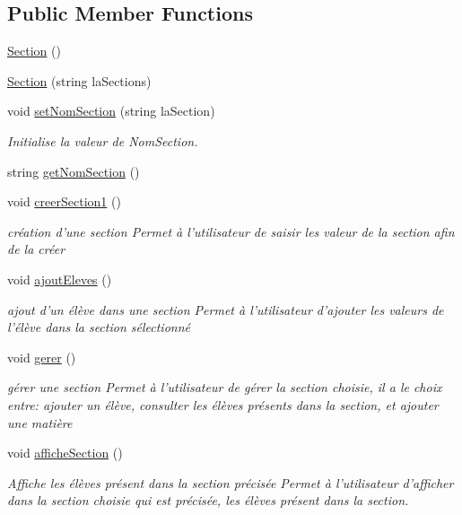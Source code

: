 \subsection*{Public Member Functions}
\begin{DoxyCompactItemize}
\item 
\hyperlink{class_section_a77b88e06692841ba49559d22a25a09f9}{Section} ()
\item 
\hyperlink{class_section_acc03e01cbc50c87d37e02b4168d6e0fc}{Section} (string la\+Sections)
\item 
void \hyperlink{class_section_adc7f73c7e76c73de88d8c59170a67383}{set\+Nom\+Section} (string la\+Section)
\begin{DoxyCompactList}\small\item\em Initialise la valeur de Nom\+Section. \end{DoxyCompactList}\item 
string \hyperlink{class_section_a432b7a6163aa6225e74de5560fe09b00}{get\+Nom\+Section} ()
\item 
void \hyperlink{class_section_a6d5c8df796b9a0664319bd768983225e}{creer\+Section1} ()
\begin{DoxyCompactList}\small\item\em création d'une section Permet à l'utilisateur de saisir les valeur de la section afin de la créer \end{DoxyCompactList}\item 
void \hyperlink{class_section_aa032f59ebbe6ade8bfb9a88eb1bf9240}{ajout\+Eleves} ()
\begin{DoxyCompactList}\small\item\em ajout d'un élève dans une section Permet à l'utilisateur d'ajouter les valeurs de l'élève dans la section sélectionné \end{DoxyCompactList}\item 
void \hyperlink{class_section_a0c869f228298503305cf7be8e8e3df91}{gerer} ()
\begin{DoxyCompactList}\small\item\em gérer une section Permet à l'utilisateur de gérer la section choisie, il a le choix entre\+: ajouter un élève, consulter les élèves présents dans la section, et ajouter une matière \end{DoxyCompactList}\item 
void \hyperlink{class_section_a68d0635c31799fcaa45d6629653296de}{affiche\+Section} ()
\begin{DoxyCompactList}\small\item\em Affiche les élèves présent dans la section précisée Permet à l'utilisateur d'afficher dans la section choisie qui est précisée, les élèves présent dans la section. \end{DoxyCompactList}\end{DoxyCompactItemize}


